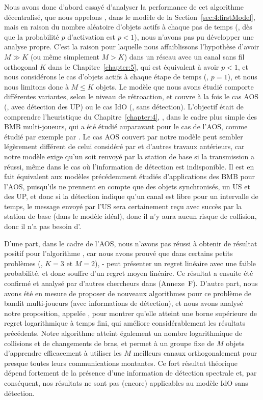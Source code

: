 \begin{resume_fr}
Nous avons donc d'abord essayé d'analyser la performance de cet algorithme décentralisé, que nous appelons \Selfish, dans le modèle de la Section~\ref{sec:4:firstModel},
mais en raison du nombre aléatoire d'objets actifs à chaque pas de temps (\ie, dès que la probabilité $p$ d'activation est $p < 1$), nous n'avons pas pu développer une analyse propre.
%
C'est la raison pour laquelle nous affaiblissons l'hypothèse d'avoir $M \gg K$ (ou même simplement $M > K$) dans un réseau avec un canal sans fil orthogonal $K$ dans le Chapitre~\ref{chapter:5}, qui est équivalent à avoir $p < 1$, et nous considérons le cas d'objets actifs à chaque étape de temps (\ie, $p=1$), et nous nous limitons donc à $M \leq K$ objets.
Le modèle que nous avons étudié comporte différentes variantes, selon le niveau de rétroaction, et couvre à la fois le cas AOS (\ie, avec détection des UP) ou le cas IdO (\ie, sans détection).
L'objectif était de comprendre l'heuristique du Chapitre~\ref{chapter:4}, \Selfish, dans le cadre plus simple des BMB multi-joueurs, qui a été étudié auparavant pour le cas de l'AOS, comme étudié par exemple par \cite{Zhao10,Anandkumar10,Anandkumar11}.
%
Le cas AOS couvert par notre modèle peut sembler légèrement différent de celui considéré par \cite{Jouini10} et d'autres travaux antérieurs,
car notre modèle exige qu'un \Ack{} soit renvoyé par la station de base si la transmission a réussi, même dans le cas où l'information de détection est indisponible.
Il est en fait équivalent aux modèles précédemment étudiés d'applications des BMB pour l'AOS, puisqu'ils ne prennent en compte que des objets synchronisés, un US et des UP, et donc si la détection indique qu'un canal est libre pour un intervalle de temps, le message envoyé par l'US sera certainement reçu avec succès par la station de base (dans le modèle idéal), donc il n'y aura aucun risque de collision, donc il n'a pas besoin d'\Ack.


D'une part, dans le cadre de l'AOS, nous n'avons pas réussi à obtenir de résultat positif pour l'algorithme \Selfish, car nous avons prouvé que dans certains petits problèmes (\eg, $K=3$ et $M=2$), \Selfish-\UCB{} peut présenter un regret linéaire avec une faible probabilité, et donc souffre d'un regret moyen linéaire.
Ce résultat a ensuite été confirmé et analysé par d'autres chercheurs dans \cite{BoursierPerchet18} (Annexe~F).
%
D'autre part, nous avons été en mesure de proposer de nouveaux algorithmes pour ce problème de bandit multi-joueurs (avec informations de détection), et nous avons analysé notre proposition, appelée \MCTopM, pour montrer qu'elle atteint une borne supérieure de regret logarithmique à temps fini, qui améliore considérablement les résultats précédents.
Notre algorithme atteint également un nombre logarithmique de collisions et de changements de bras, et permet à un groupe fixe de $M$ objets d'apprendre efficacement à utiliser les $M$ meilleurs canaux orthogonalement pour presque toutes leurs communications montantes.
%
Ce fort résultat théorique dépend fortement de la présence d'une information de détection spectrale et, par conséquent, nos résultats ne sont pas (encore) applicables au modèle IdO sans détection.



\end{resume_fr}

